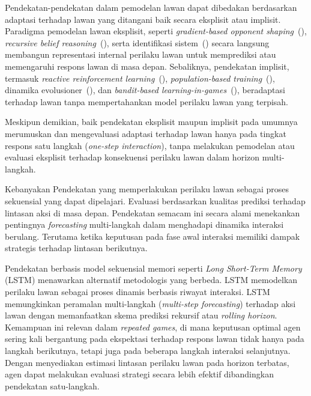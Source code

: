 Pendekatan-pendekatan dalam pemodelan lawan dapat dibedakan berdasarkan adaptasi terhadap lawan yang ditangani baik secara eksplisit atau implisit. Paradigma pemodelan lawan eksplisit, seperti \textit{gradient-based opponent shaping}~(\cite{qiao_o2m_2024, hu_modeling_2023, wang_achieving_2019}), \textit{recursive belief reasoning}~(\cite{freire_modeling_2023, de_weerd_higher-order_2022}), serta identifikasi sistem~(\cite{li_exploiting_2025}) secara langsung membangun representasi internal perilaku lawan untuk memprediksi atau memengaruhi respons lawan di masa depan. Sebaliknya, pendekatan implisit, termasuk \textit{reactive reinforcement learning}~(\cite{lv_inducing_2023}), \textit{population-based training}~(\cite{perera_learning_2025}), dinamika evolusioner~(\cite{zhu_evolutionary_2025, di_coupling_2023, elhamer_effects_2020}), dan \textit{bandit-based learning-in-games}~(\cite{gomez_grounded_2025}), beradaptasi terhadap lawan tanpa mempertahankan model perilaku lawan yang terpisah.

Meskipun demikian, baik pendekatan eksplisit maupun implisit pada umumnya merumuskan dan mengevaluasi adaptasi terhadap lawan hanya pada tingkat respons satu langkah (\textit{one-step interaction}), tanpa melakukan pemodelan atau evaluasi eksplisit terhadap konsekuensi perilaku lawan dalam horizon multi-langkah.

Kebanyakan Pendekatan yang memperlakukan perilaku lawan sebagai proses sekuensial yang dapat dipelajari. Evaluasi berdasarkan kualitas prediksi terhadap lintasan aksi di masa depan. Pendekatan semacam ini secara alami menekankan pentingnya \textit{forecasting} multi-langkah dalam menghadapi dinamika interaksi berulang. Terutama ketika keputusan pada fase awal interaksi memiliki dampak strategis terhadap lintasan berikutnya. 

Pendekatan berbasis model sekuensial memori seperti \textit{Long Short-Term Memory} (LSTM) menawarkan alternatif metodologis yang berbeda. LSTM memodelkan perilaku lawan sebagai proses dinamis berbasis riwayat interaksi. LSTM memungkinkan peramalan multi-langkah (\textit{multi-step forecasting}) terhadap aksi lawan dengan memanfaatkan skema prediksi rekursif atau \textit{rolling horizon}. Kemampuan ini relevan dalam \textit{repeated games}, di mana keputusan optimal agen sering kali bergantung pada ekspektasi terhadap respons lawan tidak hanya pada langkah berikutnya, tetapi juga pada beberapa langkah interaksi selanjutnya. Dengan menyediakan estimasi lintasan perilaku lawan pada horizon terbatas, agen dapat melakukan evaluasi strategi secara lebih efektif dibandingkan pendekatan satu-langkah.

